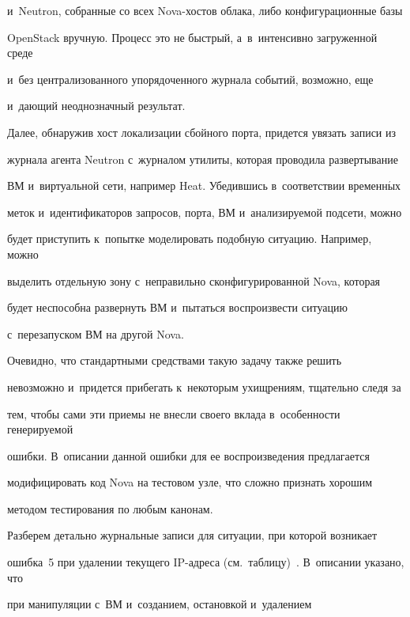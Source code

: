 и~Neutron, собранные со всех Nova-хостов облака, либо конфигурационные базы 


OpenStack вручную. Процесс это не быстрый, а~в~интенсивно загруженной среде 


и~без централизованного упорядоченного журнала событий, возможно, еще 


и~дающий неоднозначный результат. 


  


  Далее, обнаружив хост локализации сбойного порта, придется увязать записи из 


журнала агента Neutron с~журналом утилиты, которая проводила развертывание 


ВМ и~виртуальной сети, например Heat. Убедившись в~соответствии временн$\acute{\mbox{ы}}$х 


меток и~идентификаторов запросов, порта, ВМ и~анализируемой подсети, можно 


будет приступить к~попытке моделировать подобную ситуацию. Например, можно 


выделить отдельную зону с~неправильно сконфигурированной Nova, которая 


будет неспособна развернуть ВМ и~пытаться воспроизвести ситуацию 


с~перезапуском ВМ на другой Nova. 


  


  Очевидно, что стандартными средствами такую задачу также решить 


невозможно и~придется прибегать к~некоторым ухищрениям, тщательно следя за 


тем, чтобы сами эти приемы не внесли своего вклада в~особенности генерируемой 


ошибки. В~описании данной ошибки для ее воспроизведения предлагается 


модифицировать код Nova на тестовом узле, что сложно признать хорошим 


методом тестирования по любым канонам. 


   


   Разберем детально журнальные записи для ситуации, при которой возникает 


ошибка~5 при удалении текущего IP-ад\-ре\-са (см.\ таблицу)~\cite{7-g7}. В~описании указано, что 


при манипуляции с~ВМ и~созданием, остановкой и~удалением 


